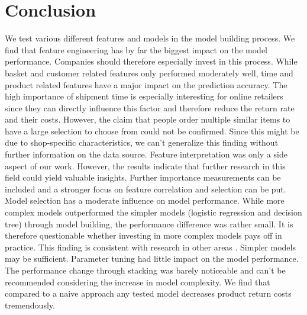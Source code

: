 \documentclass[12pt]{article}
\begin{document}
\section{Conclusion}
We test various different features and models in the model building process. We find that feature engineering has by far the biggest impact on the model performance. Companies should therefore especially invest in this process. While basket and customer related features only performed moderately well, time and product related features have a major impact on the prediction accuracy. The high importance of shipment time is especially interesting for online retailers since they can directly influence this factor and therefore reduce the return rate and their costs. However, the claim that people order multiple similar items to have a large selection to choose from could not be confirmed. Since this might be due to shop-specific characteristics, we can’t generalize this finding without further information on the data source. Feature interpretation was only a side aspect of our work. However, the results indicate that further research in this field could yield valuable insights. Further importance measurements can be included and a stronger focus on feature correlation and selection can be put. Model selection has a moderate influence on model performance. While more complex models outperformed the simpler models (logistic regression and decision tree) through model building, the performance difference was rather small. It is therefore questionable whether investing in more complex models pays off in practice. This finding is consistent with research in other areas \cite{lessmann2015benchmarking}. Simpler models may be sufficient. Parameter tuning had little impact on the model performance. The performance change through stacking was barely noticeable and can’t be recommended considering the increase in model complexity. We find that compared to a naive approach any tested model decreases product return costs tremendously.
\newpage
\end{document}
